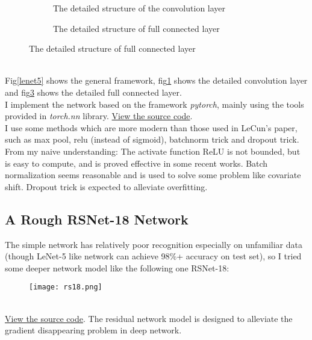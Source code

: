 \documentclass{article}
\begin{document}
\begin{figure}[htb]
\begin{minipage}[h]{0.48\linewidth}
\begin{figure}[H]
\caption{The detailed structure of the convolution layer}
\label{convlayer}
\end{figure}
\begin{figure}[H]
\centering
{}
\caption{The detailed structure of full connected layer}
\label{fclayer}
\end{figure}
\end{minipage}
\end{figure}
~\\
Fig\ref{lenet5} shows the general framework, fig\ref{convlayer} shows the detailed convolution layer and fig\ref{fclayer} shows the detailed full connected layer.\\
I implement the network based on the framework \emph{pytorch}, mainly using the tools provided in \emph{torch.nn} library. \href{https://github.com/lym01803/EI339-final-sudoku/blob/dev/source/model.py}{View the source code}.\\
I use some methods which are more modern than those used in LeCun's paper, such as max pool, relu (instead of sigmoid), batchnorm trick and dropout trick. From my naive understanding: The activate function ReLU is not bounded, but is easy to compute, and is proved effective in some recent works. Batch normalization seems reasonable and is used to solve some problem like covariate shift. Dropout trick is expected to alleviate overfitting.
\subsection{A Rough RSNet-18 Network}
The simple network has relatively poor recognition especially on unfamiliar data (though LeNet-5 like network can achieve 98\%+ accuracy on test set), so I tried some deeper network model like the following one RSNet-18:
\begin{figure}[htb]
\centering
\texttt{[image: rs18.png]}
\end{figure} 
~\\
\href{https://github.com/lym01803/EI339-final-sudoku/blob/dev/source/model.py}{View the source code}. The residual network model is designed to alleviate the gradient disappearing problem in deep network.
\end{document}
